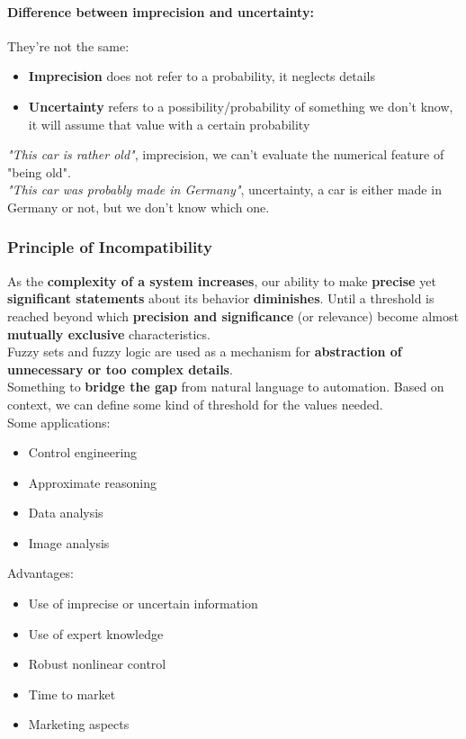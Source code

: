 \newpage

\paragraph{Difference between imprecision and uncertainty:} They're not the same: 
\begin{itemize}
	\item \textbf{Imprecision} does not refer to a probability, it neglects details 
	\item \textbf{Uncertainty} refers to a possibility/probability of something we don't know, it will assume that value with a certain probability
\end{itemize}

\textit{"This car is rather old"}, imprecision, we can't evaluate the numerical feature of "being old".\\
\textit{"This car was probably made in Germany"}, uncertainty, a car is either made in Germany or not, but we don't know which one.\\

\subsubsection{Principle of Incompatibility}
As the \textbf{complexity of a system increases}, our ability to make \textbf{precise} yet \textbf{significant statements} about its behavior \textbf{diminishes}. Until a threshold is reached beyond which \textbf{precision and significance} (or relevance) become almost \textbf{mutually exclusive} characteristics.\\

Fuzzy sets and fuzzy logic are used as a mechanism for \textbf{abstraction of unnecessary or too complex details}.\\

Something to \textbf{bridge the gap} from natural language to automation. Based on context, we can define some kind of threshold for the values needed.\\

Some applications: 
\begin{itemize}
	\item Control engineering 
	\item Approximate reasoning
	\item Data analysis 
	\item Image analysis
\end{itemize}
Advantages: 
\begin{itemize}
	\item Use of imprecise or uncertain information
	\item Use of expert knowledge 
	\item Robust nonlinear control 
	\item Time to market 
	\item Marketing aspects 
\end{itemize}

